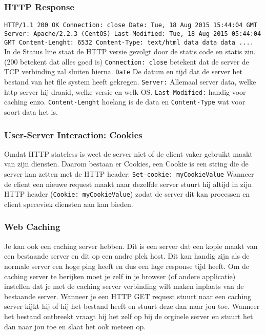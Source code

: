 \subsubsection*{HTTP Response}
\texttt{HTTP/1.1 200 OK \newline
		Connection: close \newline
		Date: Tue, 18 Aug 2015 15:44:04 GMT \newline
		Server: Apache/2.2.3 (CentOS) \newline
		Last-Modified: Tue, 18 Aug 2015 05:44:04 GMT \newline
		Content-Lenght: 6532 \newline
		Content-Type: text/html \newline \newline
		data data data .... }
\newline
In de Status line staat de HTTP versie gevolgt door de statis code en statis zin. (200 betekent dat alles goed is) \texttt{Connection: close} betekent dat de server de TCP verbinding zal sluiten hierna. \texttt{Date} De datum en tijd dat de server het bestand van het file system heeft gekregen. \texttt{Server:} Allemaal server data, welke http server hij draaid, welke versie en welk OS. \texttt{Last-Modified:} handig voor caching enzo. \texttt{Content-Lenght} hoelang is de data en \texttt{Content-Type} wat voor soort data het is.

\subsubsection{User-Server Interaction: Cookies}
Omdat HTTP stateless is weet de server niet of de client vaker gebruikt maakt van zijn diensten. Daarom bestaan er Cookies, een Cookie is een string die de server kan zetten met de HTTP header: \texttt{Set-cookie: myCookieValue} Wanneer de client een nieuwe request maakt naar dezelfde server stuurt hij altijd in zijn HTTP header (\texttt{Cookie: myCookieValue}) zodat de server dit kan processen en client speceviek diensten aan kan bieden.


\subsubsection{Web Caching}
Je kan ook een caching server hebben. Dit is een server dat een kopie maakt van een bestaande server en dit op een andre plek host. Dit kan handig zijn als de normale server een hoge ping heeft en dus een lage response tijd heeft. Om de caching server te berijken moet je zelf in je browser (of andere applicatie) instellen dat je met de caching server verbinding wilt maken inplaats van de bestaande server.
\newline
Wanneer je een HTTP GET request stuurt naar een caching server kijkt hij of hij het bestand heeft en stuurt deze dan naar jou toe. Wanneer het bestand ontbreekt vraagt hij het zelf op bij de orginele server en stuurt het dan naar jou toe en slaat het ook meteen op.
